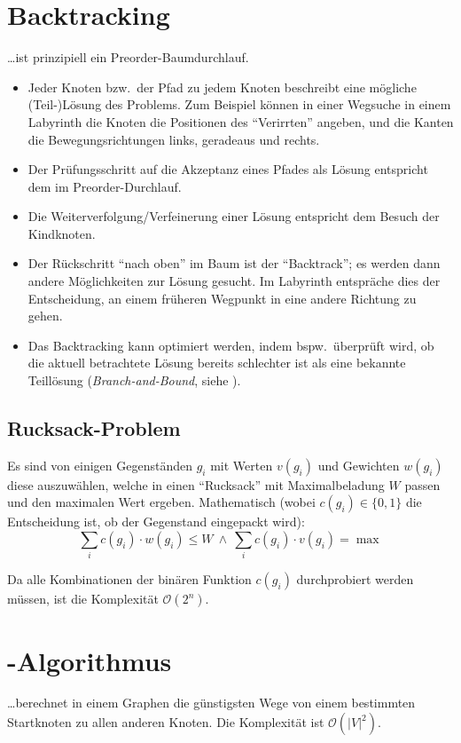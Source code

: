 \section{Backtracking}
\ldots ist prinzipiell ein Preorder-Baumdurchlauf.
\begin{itemize}
  \item Jeder Knoten bzw.~der Pfad zu jedem Knoten beschreibt eine mögliche (Teil-)Lösung des Problems.
        Zum Beispiel können in einer Wegsuche in einem Labyrinth die Knoten die Positionen des \enquote{Verirrten} angeben, und die Kanten die Bewegungsrichtungen links, geradeaus und rechts.
  \item Der Prüfungsschritt auf die Akzeptanz eines Pfades als Lösung entspricht dem  im Preorder-Durchlauf.
  \item Die Weiterverfolgung/Verfeinerung einer Lösung entspricht dem Besuch der Kindknoten.
  \item Der Rückschritt \enquote{nach oben} im Baum ist der \enquote{Backtrack}; es werden dann andere Möglichkeiten zur Lösung gesucht.
        Im Labyrinth entspräche dies der Entscheidung, an einem früheren Wegpunkt in eine andere Richtung zu gehen.
  \item Das Backtracking kann optimiert werden, indem bspw.~überprüft wird, ob die aktuell betrachtete Lösung bereits schlechter ist als eine bekannte Teillösung (\emph{Branch-and-Bound}, siehe ).
\end{itemize}

\subsection{Rucksack-Problem}
Es sind von einigen Gegenständen $g_i$ mit Werten $v(g_i)$ und Gewichten $w(g_i)$ diese auszuwählen, welche in einen \enquote{Rucksack} mit Maximalbeladung $W$ passen und den maximalen Wert ergeben.
Mathematisch (wobei $c(g_i) \in \{0,1\}$ die Entscheidung ist, ob der Gegenstand eingepackt wird):
\[
  \sum_i c(g_i) \cdot w(g_i) \leq W \: \land \: \sum_i c(g_i) \cdot v(g_i) = \max
\]

Da alle Kombinationen der binären Funktion $c(g_i)$ durchprobiert werden müssen, ist die Komplexität $\mathcal{O}(2^n)$.

\section{\protect{}-Algorithmus}
\ldots berechnet in einem Graphen die günstigsten Wege von einem bestimmten Startknoten zu allen anderen Knoten.
Die Komplexität ist $\mathcal{O}(\lvert V \rvert^2)$.

